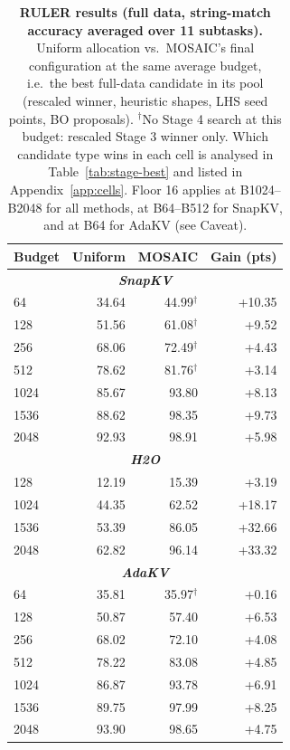 \documentclass[11pt]{article}
\begin{document}
\begin{table}[t]
  \centering
  \small
  \setlength{\tabcolsep}{16pt}
  \begin{tabular}{@{} l r r r @{}}
    \toprule
    \textbf{Budget} & \textbf{Uniform} & \textbf{MOSAIC} & \textbf{Gain (pts)} \\
    \midrule
    \multicolumn{4}{c}{\textbf{\textit{SnapKV}}} \\
    \midrule
    \rowcolor{gray!10}
    64 & 34.64 & 44.99$^\dagger$ & +10.35 \\
    128 & 51.56 & 61.08$^\dagger$ & +9.52 \\
    \rowcolor{gray!10}
    256 & 68.06 & 72.49$^\dagger$ & +4.43 \\
    512 & 78.62 & 81.76$^\dagger$ & +3.14 \\
    \rowcolor{gray!10}
    1024 & 85.67 & 93.80 & +8.13 \\
    1536 & 88.62 & 98.35 & +9.73 \\
    \rowcolor{gray!10}
    2048 & 92.93 & 98.91 & +5.98 \\
    \midrule
    \multicolumn{4}{c}{\textbf{\textit{H2O}}} \\
    \midrule
    \rowcolor{gray!10}
    128 & 12.19 & 15.39 & +3.19 \\
    1024 & 44.35 & 62.52 & +18.17 \\
    \rowcolor{gray!10}
    1536 & 53.39 & 86.05 & +32.66 \\
    2048 & 62.82 & 96.14 & +33.32 \\
    \midrule
    \multicolumn{4}{c}{\textbf{\textit{AdaKV}}} \\
    \midrule
    \rowcolor{gray!10}
    64 & 35.81 & 35.97$^\dagger$ & +0.16 \\
    128 & 50.87 & 57.40 & +6.53 \\
    \rowcolor{gray!10}
    256 & 68.02 & 72.10 & +4.08 \\
    512 & 78.22 & 83.08 & +4.85 \\
    \rowcolor{gray!10}
    1024 & 86.87 & 93.78 & +6.91 \\
    1536 & 89.75 & 97.99 & +8.25 \\
    \rowcolor{gray!10}
    2048 & 93.90 & 98.65 & +4.75 \\
    \bottomrule
  \end{tabular}
  \caption{\textbf{RULER results (full data, string-match accuracy averaged over 11 subtasks).} Uniform allocation vs.\ MOSAIC's final configuration at the same average budget, i.e.\ the best full-data candidate in its pool (rescaled winner, heuristic shapes, LHS seed points, BO proposals). $^\dagger$No Stage 4 search at this budget: rescaled Stage 3 winner only. Which candidate type wins in each cell is analysed in Table~\ref{tab:stage-best} and listed in Appendix~\ref{app:cells}. Floor 16 applies at B1024--B2048 for all methods, at B64--B512 for SnapKV, and at B64 for AdaKV (see Caveat).}
  \label{tab:ruler-summary}
\end{table}
\end{document}
